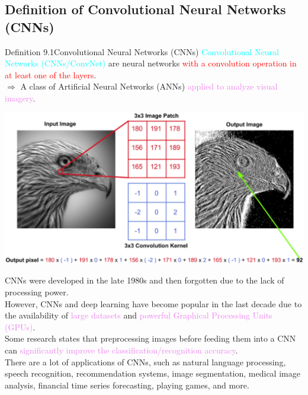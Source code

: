 \documentclass{book}
\begin{document}
\subsection{Definition of Convolutional Neural Networks (CNNs)}
\begin{defBox}{Definition 9.1}{Convolutional Neural Networks (CNNs)}
    \textcolor{cyan}{Convolutional Neural Networks (CNNs/ConvNet)} are neural networks \textcolor{red}{with a convolution operation in at least one of the layers}.\\
    $\Rightarrow$ A class of Artificial Neural Networks (ANNs) \textcolor{violet}{applied to analyze visual imagery}.
\end{defBox}
\begin{center}
    \includegraphics[scale=0.23]{chapter 9/ch9_figure1.jpeg}
\end{center}
CNNs were developed in the late 1980s and then forgotten due to the lack of processing power.\\
However, CNNs and deep learning have become popular in the last decade due to the availability of \textcolor{violet}{large datasets} and \textcolor{violet}{powerful Graphical Processing Units (GPUs)}.\\
Some research states that preprocessing images before feeding them into a CNN can \textcolor{violet}{significantly improve the classification/recognition accuracy}.\\
\vspace{2mm}
There are a lot of applications of CNNs, such as natural language processing, speech recognition, recommendation systems, image segmentation, medical image analysis, financial time series forecasting, playing games, and more.
\end{document}
